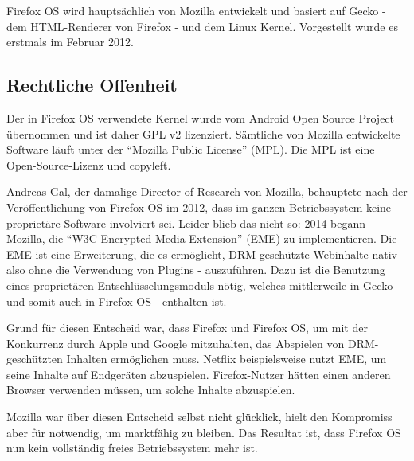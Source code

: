 Firefox OS wird hauptsächlich von Mozilla entwickelt und basiert auf Gecko - dem HTML-Renderer von Firefox - und dem Linux Kernel\thinspace\cite{online:ff-architecture}. Vorgestellt wurde es erstmals im Februar 2012\thinspace\cite{online:ff-techhive-b2g}.\\

\subsection{Rechtliche Offenheit}
Der in Firefox OS verwendete Kernel wurde vom Android Open Source Project übernommen und ist daher GPL v2 lizenziert\thinspace\cite{online:kernel-license}. Sämtliche von Mozilla entwickelte Software läuft unter der ``Mozilla Public License'' (MPL)\thinspace\cite{online:mozilla-licensing}. Die MPL ist eine Open-Source-Lizenz und copyleft\thinspace\cite{online:mpl}.

Andreas Gal, der damalige Director of Research von Mozilla, behauptete nach der Veröffentlichung von Firefox OS im 2012, dass im ganzen Betriebssystem keine proprietäre Software involviert sei\thinspace\cite{online:knowyourmobile-b2g}. Leider blieb das nicht so: 2014 begann Mozilla, die ``W3C Encrypted Media Extension'' (EME) zu implementieren\thinspace\cite{online:mozilla-eme}. Die EME  ist eine Erweiterung, die es ermöglicht, DRM-geschützte Webinhalte nativ - also ohne die Verwendung von Plugins - auszuführen. Dazu ist die Benutzung eines proprietären Entschlüsselungsmoduls nötig\thinspace\cite{online:mozilla-eme}, welches mittlerweile in Gecko - und somit auch in Firefox OS - enthalten ist.

Grund für diesen Entscheid war, dass Firefox und Firefox OS, um mit der Konkurrenz durch Apple und Google mitzuhalten, das Abspielen von DRM-geschützten Inhalten ermöglichen muss. Netflix beispielsweise nutzt EME, um seine Inhalte auf Endgeräten abzuspielen. Firefox-Nutzer hätten einen anderen Browser verwenden müssen, um solche Inhalte abzuspielen\thinspace\cite{online:mozilla-eme}.

Mozilla war über diesen Entscheid selbst nicht glücklick\thinspace\cite{online:ff-drm-implementation}, hielt den Kompromiss aber für notwendig, um marktfähig zu bleiben. Das Resultat ist, dass Firefox OS nun kein vollständig freies Betriebssystem mehr ist. \\


